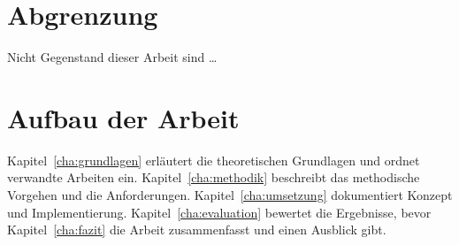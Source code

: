 \section{Abgrenzung}
\label{sec:abgrenzung}

Nicht Gegenstand dieser Arbeit sind \ldots

\section{Aufbau der Arbeit}
\label{sec:aufbau}

Kapitel~\ref{cha:grundlagen} erläutert die theoretischen Grundlagen und ordnet
verwandte Arbeiten ein. Kapitel~\ref{cha:methodik} beschreibt das methodische
Vorgehen und die Anforderungen. Kapitel~\ref{cha:umsetzung} dokumentiert Konzept und
Implementierung. Kapitel~\ref{cha:evaluation} bewertet die Ergebnisse, bevor
Kapitel~\ref{cha:fazit} die Arbeit zusammenfasst und einen Ausblick gibt.
